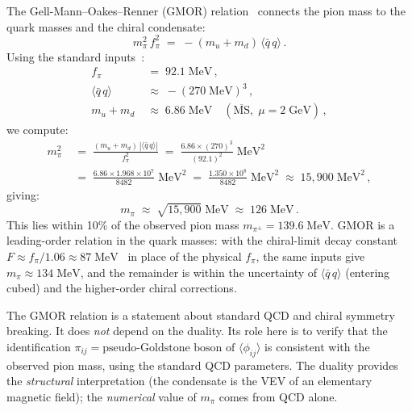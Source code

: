 \documentclass[11pt,a4paper]{article}
\newcommand{\fpi}{f_\pi}
\newcommand{\qqbar}{\langle \bar{q}\,q \rangle}
\begin{document}
The Gell-Mann--Oakes--Renner (GMOR) relation~\cite{GMOR1968} connects
the pion mass to the quark masses and the chiral condensate:
\begin{equation}\label{eq:gmor}
  \boxed{
  m_\pi^2\, \fpi^2 \;=\; -(m_u + m_d)\,\qqbar\,.
  }
\end{equation}
Using the standard inputs~\cite{PDG2024,FLAG2024}:
\begin{align}
  \fpi &\;=\; 92.1\;\text{MeV}\,, \label{eq:fpi-value} \\
  \qqbar &\;\approx\; -(270\;\text{MeV})^3\,, \label{eq:qqbar-value} \\
  m_u + m_d &\;\approx\; 6.86\;\text{MeV}
    \quad (\overline{\text{MS}},\; \mu = 2\;\text{GeV})\,,
    \label{eq:mq-value}
\end{align}
we compute:
\begin{align}
  m_\pi^2 &\;=\; \frac{(m_u + m_d)\,|\qqbar|}{\fpi^2}
  \;=\; \frac{6.86 \times (270)^3}{(92.1)^2}\;\text{MeV}^2
    \nonumber \\
  &\;=\; \frac{6.86 \times 1.968 \times 10^7}{8482}\;\text{MeV}^2
  \;=\; \frac{1.350 \times 10^8}{8482}\;\text{MeV}^2
  \;\approx\; 15{,}900\;\text{MeV}^2\,, \label{eq:gmor-num}
\end{align}
giving:
\begin{equation}\label{eq:mpi-result}
  m_\pi \;\approx\; \sqrt{15{,}900}\;\text{MeV}
  \;\approx\; 126\;\text{MeV}\,.
\end{equation}
This lies within 10\% of the observed pion mass
$m_{\pi^\pm} = 139.6\;\text{MeV}$.  GMOR is a leading-order relation in
the quark masses: with the chiral-limit decay constant
$F \approx \fpi/1.06 \approx 87\;\text{MeV}$~\cite{FLAG2024} in place of
the physical $\fpi$, the same inputs give $m_\pi \approx 134\;\text{MeV}$,
and the remainder is within the uncertainty of $\qqbar$ (entering
cubed) and the higher-order chiral corrections.

\begin{remark}
The GMOR relation is a statement about standard QCD and chiral
symmetry breaking.  It does \emph{not} depend on the duality.
Its role here is to verify that the identification
$\pi_{ij} = \text{pseudo-Goldstone boson of } \langle \phi_{ij} \rangle$
is consistent with the observed pion mass, using the standard QCD
parameters.  The duality provides the \emph{structural} interpretation
(the condensate is the VEV of an elementary magnetic field); the
\emph{numerical} value of $m_\pi$ comes from QCD alone.
\end{remark}
\end{document}
